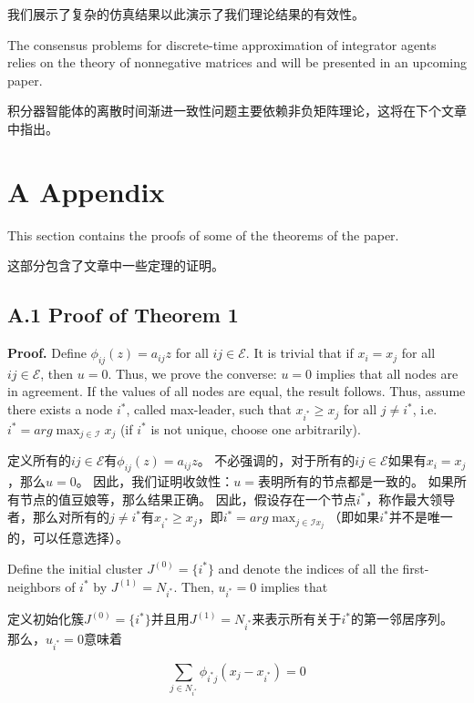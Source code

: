 \documentclass{article}
\begin{document}
我们展示了复杂的仿真结果以此演示了我们理论结果的有效性。

{\color[gray]{0.5}
The consensus problems for discrete-time approximation of integrator agents relies on the theory of nonnegative matrices and will be presented in an upcoming paper.
}

积分器智能体的离散时间渐进一致性问题主要依赖非负矩阵理论，这将在下个文章中指出。

\section*{A Appendix}
{\color[gray]{0.5}
This section contains the proofs of some of the theorems of the paper.
}

这部分包含了文章中一些定理的证明。

\subsection*{A.1 Proof of Theorem 1}
{\color[gray]{0.5}
\noindent \textbf{Proof.} Deﬁne $\phi_{ij}(z) = a_{ij}z$ for all $ij \in \mathcal{E}$. 
It is trivial that if $x_i=x_j$ for all $ij \in \mathcal{E}$, then $u=0$. 
Thus, we prove the converse: $u=0$ implies that all nodes are in agreement. 
If the values of all nodes are equal, the result follows. 
Thus, assume there exists a node $i^*$, called max-leader, such that $x_{i^*}\ge x_j$ for all $j\ne i^*$, i.e. $i^* = arg\max_{j\in \mathcal{I}} x_j$ (if $i^*$ is not unique, choose one arbitrarily).
}

\noindent 定义所有的$ij \in \mathcal{E}$有$\phi_{ij}(z) = a_{ij}z$。
不必强调的，对于所有的$ij \in \mathcal{E}$如果有$x_i = x_j$，那么$u=0$。
因此，我们证明收敛性：$u=$表明所有的节点都是一致的。
如果所有节点的值豆娘等，那么结果正确。
因此，假设存在一个节点$i^*$，称作最大领导者，那么对所有的$j\ne i^*$有$x_{i^*}\ge x_j$，即$i^* = arg\max_{j\in \mathcal{I} x_j}$（即如果$i^*$并不是唯一的，可以任意选择）。

{\color[gray]{0.5}
Deﬁne the initial cluster $J^{(0)}=\{ i^* \}$ and denote the indices of all the ﬁrst-neighbors of $i^*$ by $J^{(1)}=N_{i^*}$. 
Then, $u_{i^*}=0$ implies that
}

定义初始化簇$J^{(0)}=\{ i^* \}$并且用$J^{(1)}=N_{i^*}$来表示所有关于$i^*$的第一邻居序列。
那么，$u_{i^*}=0$意味着

\begin{equation}
    \tag{45}
    \label{45}
    \sum_{j\in N_{i^*}} \phi_{i^*j}(x_j-x_{i^*}) = 0
\end{equation}
\end{document}
